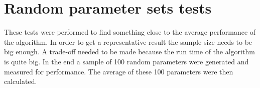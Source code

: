 

\section{Random parameter sets tests}

These tests were performed to find something close to the average performance of the algorithm. In order to get a representative result the sample size needs to be big enough. A trade-off needed to be made because the run time of the algorithm is quite big. In the end a sample of 100 random parameters were generated and measured for performance. The average of these 100 parameters were then calculated.

